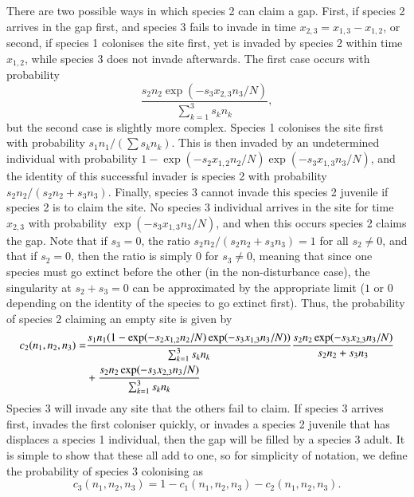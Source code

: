 There are two possible ways in which species 2 can claim a gap. First, if species 2 arrives in the gap first, and species 3 fails to invade in time $x_{2,3}=x_{1,3}-x_{1,2}$, or second, if species 1 colonises the site first, yet is invaded by species 2 within time $x_{1,2}$, while species 3 does not invade afterwards. The first case occurs with probability
$$
\frac{s_2 n_2\exp(-s_3x_{2,3}n_3/N)}{\sum_{k=1}^3 s_k n_k},
$$
but the second case is slightly more complex. Species 1 colonises the site first with probability $s_1n_1/(\sum s_kn_k)$. This is then invaded by an undetermined individual with probability $1-\exp(-s_2x_{1,2}n_2/N)\exp(-s_3x_{1,3}n_3/N)$, and the identity of this successful invader is species 2 with probability $s_2n_2/(s_2n_2+s_3n_3)$. Finally, species 3 cannot invade this species 2 juvenile if species 2 is to claim the site. No species 3 individual arrives in the site for time $x_{2,3}$ with probability $\exp(-s_3x_{1,3}n_3/N)$, and when this occurs species 2 claims the gap. Note that if $s_3=0$, the ratio $s_2n_2/(s_2n_2+s_3n_3)=1$ for all $s_2 \neq 0$, and that if $s_2=0$, then the ratio is simply $0$ for $s_3 \neq0$, meaning that since one species must go extinct before the other (in the non-disturbance case), the singularity at $s_2+s_3=0$ can be approximated by the appropriate limit ($1$ or $0$ depending on the identity of the species to go extinct first). Thus, the probability of species 2 claiming an empty site is given by
\begin{align}
\label{c2}
c_2(n_1,n_2,n_3)=&\frac{s_1 n_1(1-\exp(-s_2x_{1,2}n_2/N)\exp(-s_3x_{1,3}n_3/N))}{\sum_{k=1}^3 s_k n_k}\frac{s_2 n_2\exp(-s_3x_{2,3}n_3/N)}{s_2n_2+s_3n_3} \notag \\
&+\frac{s_2 n_2\exp(-s_3x_{2,3}n_3/N)}{\sum_{k=1}^3 s_k n_k}
\end{align}
Species 3 will invade any site that the others fail to claim. If species 3 arrives first, invades the first coloniser quickly, or invades a species 2 juvenile that has displaces a species 1 individual, then the gap will be filled by a species 3 adult. It is simple to show that these all add to one, so for simplicity of notation, we define the probability of species 3 colonising as
\begin{equation}
\label{c3}
c_3(n_1,n_2,n_3)=1-c_1(n_1,n_2,n_3)-c_2(n_1,n_2,n_3).\end{equation}

